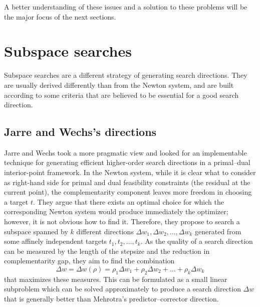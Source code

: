 A better understanding of these issues and a solution to these
problems will be the major focus of the next sections.


%
%
\section{Subspace searches}

Subspace searches are a different strategy of generating search 
directions. 
They are usually derived differently than from the Newton system, and 
are built according to some criteria that are believed to be essential 
for a good search direction.

%
%
\subsection{Jarre and Wechs's directions}

Jarre and Wechs \cite{JarreWechs} took a more pragmatic view and
looked for an implementable technique for generating efficient 
higher-order search directions in a primal--dual interior-point framework.
In the Newton system, while it is clear what to consider as right-hand 
side for primal and dual feasibility constraints (the residual 
at the current point), the complementarity component leaves more 
freedom in choosing a target $t$. They argue that there exists 
an optimal choice for which the corresponding Newton system would 
produce immediately the optimizer; however, it is not obvious how 
to find it.
Therefore, they propose to search a subspace spanned by $k$ different 
directions $\Delta w_1, \Delta w_2, \ldots, \Delta w_k$ generated 
from some affinely independent targets $t_1,t_2,\ldots,t_k$.
As the quality of a search direction can be measured by the length 
of the stepsize and the reduction in complementarity gap, they aim 
to find the combination 
\[
\Delta w = \Delta w(\rho) 
         = \rho_1\Delta w_1 + \rho_2\Delta w_2 + \ldots + \rho_k\Delta w_k
\]
that maximizes these measures.
This can be formulated as a small linear subproblem which can 
be solved approximately to produce a search direction $\Delta w$ 
that is generally better than Mehrotra's predictor--corrector direction.


